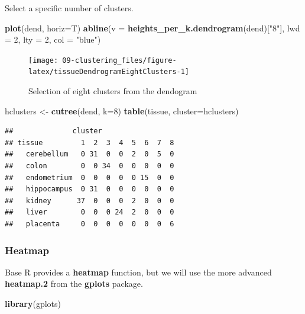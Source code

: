 \documentclass[]{book}
\newenvironment{Shaded}{\begin{snugshade}}{\end{snugshade}}
\newcommand{\KeywordTok}[1]{\textcolor[rgb]{0.13,0.29,0.53}{\textbf{{#1}}}}
\newcommand{\DataTypeTok}[1]{\textcolor[rgb]{0.13,0.29,0.53}{{#1}}}
\newcommand{\DecValTok}[1]{\textcolor[rgb]{0.00,0.00,0.81}{{#1}}}
\newcommand{\StringTok}[1]{\textcolor[rgb]{0.31,0.60,0.02}{{#1}}}
\newcommand{\NormalTok}[1]{{#1}}
\theoremstyle{definition}
\theoremstyle{definition}
\theoremstyle{definition}
\theoremstyle{remark}
\begin{document}
Select a specific number of clusters.

\begin{Shaded}
\begin{Highlighting}[]
\KeywordTok{plot}\NormalTok{(dend, }\DataTypeTok{horiz=}\NormalTok{T)}
\KeywordTok{abline}\NormalTok{(}\DataTypeTok{v =} \KeywordTok{heights_per_k.dendrogram}\NormalTok{(dend)[}\StringTok{"8"}\NormalTok{], }\DataTypeTok{lwd =} \DecValTok{2}\NormalTok{, }\DataTypeTok{lty =} \DecValTok{2}\NormalTok{, }\DataTypeTok{col =} \StringTok{"blue"}\NormalTok{)}
\end{Highlighting}
\end{Shaded}

\begin{figure}

{\centering \texttt{[image: 09-clustering\_files/figure-latex/tissueDendrogramEightClusters-1]} 

}

\caption{Selection of eight clusters from the dendogram}\label{fig:tissueDendrogramEightClusters}
\end{figure}

\begin{Shaded}
\begin{Highlighting}[]
\NormalTok{hclusters <-}\StringTok{ }\KeywordTok{cutree}\NormalTok{(dend, }\DataTypeTok{k=}\DecValTok{8}\NormalTok{)}
\KeywordTok{table}\NormalTok{(tissue, }\DataTypeTok{cluster=}\NormalTok{hclusters)}
\end{Highlighting}
\end{Shaded}

\begin{verbatim}
##              cluster
## tissue         1  2  3  4  5  6  7  8
##   cerebellum   0 31  0  0  2  0  5  0
##   colon        0  0 34  0  0  0  0  0
##   endometrium  0  0  0  0  0 15  0  0
##   hippocampus  0 31  0  0  0  0  0  0
##   kidney      37  0  0  0  2  0  0  0
##   liver        0  0  0 24  2  0  0  0
##   placenta     0  0  0  0  0  0  0  6
\end{verbatim}

\subsubsection{Heatmap}\label{heatmap}

Base R provides a \textbf{heatmap} function, but we will use the more
advanced \textbf{heatmap.2} from the \textbf{gplots} package.

\begin{Shaded}
\begin{Highlighting}[]
\KeywordTok{library}\NormalTok{(gplots)}
\end{Highlighting}
\end{Shaded}
\end{document}
